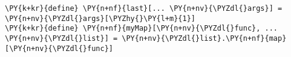 \begin{Verbatim}[commandchars=\\\{\}]
\PY{k+kr}{define} \PY{n+nf}{last}[... \PY{n+nv}{\PYZdl{}args}] = \PY{n+nv}{\PYZdl{}args}[\PYZhy{}\PY{l+m}{1}]
\PY{k+kr}{define} \PY{n+nf}{myMap}[\PY{n+nv}{\PYZdl{}func}, ... \PY{n+nv}{\PYZdl{}list}] = \PY{n+nv}{\PYZdl{}list}.\PY{n+nf}{map}[\PY{n+nv}{\PYZdl{}func}]
\end{Verbatim}

